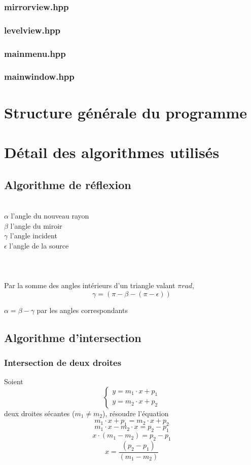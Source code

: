 \documentclass[a4paper,11pt]{report}
\begin{document}
\subsection[Le miroir]{mirrorview.hpp}
\subsection[Le niveau]{levelview.hpp}
\subsection[Le menu]{mainmenu.hpp}
\subsection[La fenêtre principale]{mainwindow.hpp}
\chapter[Structure du programme]{Structure générale du programme}



\chapter[Algorithmes]{Détail des algorithmes utilisés}
\section[Réflexion]{Algorithme de réflexion}
 \\
$\alpha$ l'angle du nouveau rayon \\
$\beta$ l'angle du miroir \\
$\gamma$ l'angle incident \\
$\epsilon$ l'angle de la source \\ \\ \\ \\
Par la somme des angles intérieurs d'un triangle valant $\pi rad$, \\
$$\gamma = (\pi - \beta - (\pi - \epsilon))$$

$\alpha = \beta - \gamma$ par les angles correspondants
\section[Intersection]{Algorithme d'intersection}

\subsection[Deux droites]{Intersection de deux droites}
Soient \\
$$\begin{cases}
	y = m_1 \cdot x + p_1 \\
	y = m_2 \cdot x + p_2
\end{cases}$$
deux droites sécantes ($m_1 \ne m_2$), résoudre l'équation \\
$$m_1 \cdot x + p_1 = m_2 \cdot x + p_2$$
$$m_1 \cdot x - m_2 \cdot x = p_2 - p_1 $$
$$x \cdot (m_1 - m_2) = p_2 - p_1$$
$$x = \frac{(p_2 - p_1)}{(m_1 - m_2)}$$
\end{document}
